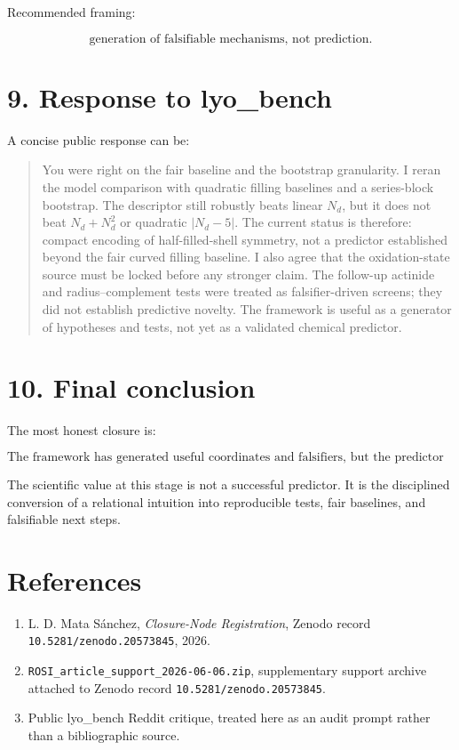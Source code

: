 Recommended framing:

\[
\boxed{\text{generation of falsifiable mechanisms, not prediction.}}
\]

\section{9. Response to lyo\_bench}\label{response-to-lyo_bench}

A concise public response can be:

\begin{quote}
You were right on the fair baseline and the bootstrap granularity. I
reran the model comparison with quadratic filling baselines and a
series-block bootstrap. The descriptor still robustly beats linear
\(N_d\), but it does not beat \(N_d+N_d^2\) or quadratic \(|N_d-5|\).
The current status is therefore: compact encoding of half-filled-shell
symmetry, not a predictor established beyond the fair curved filling
baseline. I also agree that the oxidation-state source must be locked
before any stronger claim. The follow-up actinide and radius--complement
tests were treated as falsifier-driven screens; they did not establish
predictive novelty. The framework is useful as a generator of hypotheses
and tests, not yet as a validated chemical predictor.
\end{quote}

\section{10. Final conclusion}\label{final-conclusion}

The most honest closure is:

\[
\boxed{\text{The framework has generated useful coordinates and falsifiers, but the predictor claim is currently negative.}}
\]

The scientific value at this stage is not a successful predictor. It is
the disciplined conversion of a relational intuition into reproducible
tests, fair baselines, and falsifiable next steps.

\section{References}\label{references}

\begin{enumerate}
\def\labelenumi{\arabic{enumi}.}
\tightlist
\item
  L. D. Mata Sánchez, \emph{Closure-Node Registration}, Zenodo record
  \texttt{10.5281/zenodo.20573845}, 2026.
\item
  \texttt{ROSI\_article\_support\_2026-06-06.zip}, supplementary support
  archive attached to Zenodo record \texttt{10.5281/zenodo.20573845}.
\item
  Public lyo\_bench Reddit critique, treated here as an audit prompt
  rather than a bibliographic source.
\end{enumerate}
